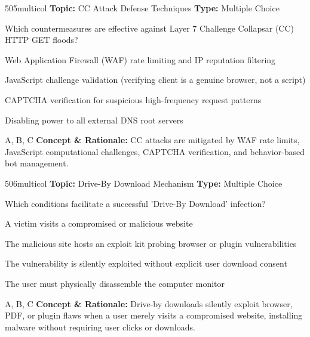 \begin{qcard}{505}{multicol}
\textcolor{darkslate!75}{\small\textbf{Topic:} CC Attack Defense Techniques \hfill \textbf{Type:} Multiple Choice}\vspace{0.4em}\par
Which countermeasures are effective against Layer 7 Challenge Collapsar (CC) HTTP GET floods?
\begin{qoptions}
\item Web Application Firewall (WAF) rate limiting and IP reputation filtering
\item JavaScript challenge validation (verifying client is a genuine browser, not a script)
\item CAPTCHA verification for suspicious high-frequency request patterns
\item Disabling power to all external DNS root servers
\end{qoptions}
\end{qcard}
\nopagebreak
\begin{explainbox}{A, B, C}
\textbf{Concept \& Rationale:} CC attacks are mitigated by WAF rate limits, JavaScript computational challenges, CAPTCHA verification, and behavior-based bot management.
\end{explainbox}

\begin{qcard}{506}{multicol}
\textcolor{darkslate!75}{\small\textbf{Topic:} Drive-By Download Mechanism \hfill \textbf{Type:} Multiple Choice}\vspace{0.4em}\par
Which conditions facilitate a successful 'Drive-By Download' infection?
\begin{qoptions}
\item A victim visits a compromised or malicious website
\item The malicious site hosts an exploit kit probing browser or plugin vulnerabilities
\item The vulnerability is silently exploited without explicit user download consent
\item The user must physically disassemble the computer monitor
\end{qoptions}
\end{qcard}
\nopagebreak
\begin{explainbox}{A, B, C}
\textbf{Concept \& Rationale:} Drive-by downloads silently exploit browser, PDF, or plugin flaws when a user merely visits a compromised website, installing malware without requiring user clicks or downloads.
\end{explainbox}

